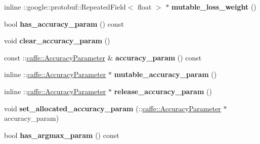 \begin{DoxyCompactItemize}
\item 
\mbox{\label{classcaffe_1_1_v1_layer_parameter_afd2f569f93b2eb0def01589deb671679}} 
inline \+::google\+::protobuf\+::\+Repeated\+Field$<$ float $>$ $\ast$ {\bfseries mutable\+\_\+loss\+\_\+weight} ()
\item 
\mbox{\label{classcaffe_1_1_v1_layer_parameter_ac06dce8f9aec2f3f9eb2b625f4429cfa}} 
bool {\bfseries has\+\_\+accuracy\+\_\+param} () const
\item 
\mbox{\label{classcaffe_1_1_v1_layer_parameter_a2f3e2107f4686a3e640585930e331360}} 
void {\bfseries clear\+\_\+accuracy\+\_\+param} ()
\item 
\mbox{\label{classcaffe_1_1_v1_layer_parameter_a066a75c96cb44846a903accfc67fc069}} 
const \+::\mbox{\hyperlink{classcaffe_1_1_accuracy_parameter}{caffe\+::\+Accuracy\+Parameter}} \& {\bfseries accuracy\+\_\+param} () const
\item 
\mbox{\label{classcaffe_1_1_v1_layer_parameter_a9128c6486279e265023580e21554ddd0}} 
inline \+::\mbox{\hyperlink{classcaffe_1_1_accuracy_parameter}{caffe\+::\+Accuracy\+Parameter}} $\ast$ {\bfseries mutable\+\_\+accuracy\+\_\+param} ()
\item 
\mbox{\label{classcaffe_1_1_v1_layer_parameter_a54b218e9dc414ff742ebd46ce7eee032}} 
inline \+::\mbox{\hyperlink{classcaffe_1_1_accuracy_parameter}{caffe\+::\+Accuracy\+Parameter}} $\ast$ {\bfseries release\+\_\+accuracy\+\_\+param} ()
\item 
\mbox{\label{classcaffe_1_1_v1_layer_parameter_a4bb886ffb8904530066e1a8653a4bc1c}} 
void {\bfseries set\+\_\+allocated\+\_\+accuracy\+\_\+param} (\+::\mbox{\hyperlink{classcaffe_1_1_accuracy_parameter}{caffe\+::\+Accuracy\+Parameter}} $\ast$accuracy\+\_\+param)
\item 
\mbox{\label{classcaffe_1_1_v1_layer_parameter_a58356877ae7fff8921ff277339d2d6a0}} 
bool {\bfseries has\+\_\+argmax\+\_\+param} () const
\item 

\end{DoxyCompactItemize}
